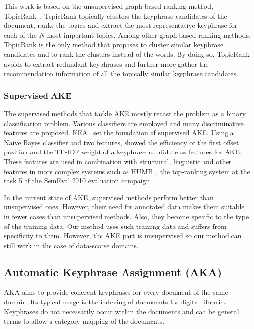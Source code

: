       This work is based on the unsupervised graph-based ranking method,
      TopicRank~\cite{bougouin2013topicrank}. TopicRank topically clusters the
      keyphrase candidates of the document, ranks the topics and extract the
      most representative keyphrase for each of the $N$ most important topics.
      Among other graph-based ranking methods, TopicRank is the only method that
      proposes to cluster similar keyphrase candidates and to rank the clusters
      instead of the words. By doing so, TopicRank avoids to extract redundant
      keyphrases and further more gather the recommendation information of all
      the topically similar keyphrase candidates.

    \subsubsection{Supervised AKE}
    \label{subsubsec:supervised_ake}
      The supervised methods that tackle AKE mostly recast the problem as a
      binary classification problem. Various classifiers are employed and many
      discriminative features are proposed. KEA~\cite{witten1999kea} set the
      foundation of supervised AKE. Using a Naive Bayes classifier and two
      features,  showed the efficiency of the first
      offset position and the TF-IDF weight of a keyphrase candidate as features
      for AKE. These features are used in combination with structural,
      linguistic and other features in more complex systems such as
      HUMB~\cite{lopez2010humb}, the top-ranking system at the task 5 of the
      SemEval 2010 evaluation compaign~\cite{kim2010semeval}.

      In the current state of AKE, supervised methods perform better than
      unsupervised ones. However, their need for annotated data makes them
      suitable in fewer cases than unsupervised methods. Also, they become
      specific to the type of the training data. Our method uses such training
      data and suffers from specificity to them. However, the AKE part is
      unsupervised so our method can still work in the case of data-scarse
      domains.

  \subsection{Automatic Keyphrase Assignment (AKA)}
  \label{subsec:aka}
    AKA aims to provide coherent keyphrases for every document of the same
    domain. Its typical usage is the indexing of documents for digital
    libraries. Keyphrases do not necessarily occur within the documents and can
    be general terms to allow a category mapping of the documents.

